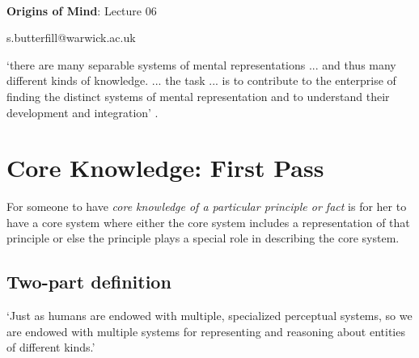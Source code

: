\documentclass[12pt]{extarticle}
\date{}
\makeatletter
\def \ititle {Origins of Mind}
\def \isubtitle {Lecture 06}
\def \iemail{s.butterfill@warwick.ac.uk}
\makeatother
\begin{document}
\begin{multicols}{3}

\setlength\footnotesep{1em}







\def \ititle {Origins of Mind}
 
\def \isubtitle {Lecture 06}
 
 
 
\
 
 
 
\begin{center}
 
{\Large
 
\textbf{\ititle}: \isubtitle
 
}
 
 
 
\iemail %
 
\end{center}
 
‘there are many separable systems of mental representations ... and thus many different kinds of knowledge. ... the task ... is to contribute to the enterprise of finding the distinct systems of mental representation and to understand their development and integration’
\citep[p.\ 1522]{Hood:2000bf}.
 
 
 
\section{Core Knowledge: First Pass}
 
For someone to have \textit{core knowledge of a particular principle or fact} is for her to have a core system where 
either the core system includes a representation of that principle or else the principle plays a special role in describing the core system.
 
\subsection{Two-part definition}
 
‘Just as humans are endowed with multiple, specialized perceptual systems, so we are endowed with multiple systems for representing and reasoning about entities of different kinds.’
\citep[p.\ 517]{Carey:1996hl}
 

\end{multicols}
\end{document}
